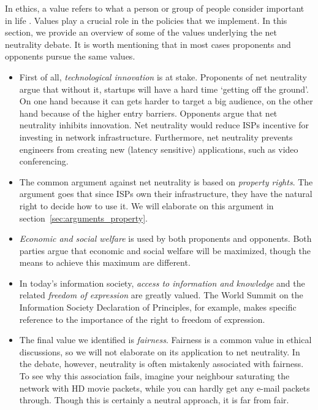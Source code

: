
In ethics, a value refers to what a person or group of people consider important in life \cite{friedman2006value}. Values play a crucial role in the policies that we implement. In this section, we provide an overview of some of the values underlying the net neutrality debate. It is worth mentioning that in most cases proponents and opponents pursue the same values.

\begin{itemize}
\item First of all, \emph{technological innovation} is at stake. Proponents of net neutrality argue that without it, startups will have a hard time `getting off the ground'. On one hand because it can gets harder to target a big audience, on the other hand because of the higher entry barriers. Opponents argue that net neutrality inhibits innovation. Net neutrality would reduce \acp{ISP} incentive for investing in network infrastructure. Furthermore, net neutrality prevents engineers from creating new (latency sensitive) applications, such as video conferencing.

\item The common argument against net neutrality is based on \emph{property rights}. The argument goes that since \acp{ISP} own their infrastructure, they have the natural right to decide how to use it. We will elaborate on this argument in section~\ref{sec:arguments_property}.

\item \emph{Economic and social welfare} is used by both proponents and opponents. Both parties argue that economic and social welfare will be maximized, though the means to achieve this maximum are different.

\item In today's information society, \emph{access to information and knowledge} and the related \emph{freedom of expression} are greatly valued. The World Summit on the Information Society Declaration of Principles, for example, makes specific reference to the importance of the right to freedom of expression.

\item The final value we identified is \emph{fairness}. Fairness is a common value in ethical discussions, so we will not elaborate on its application to net neutrality. In the debate, however, neutrality is often mistakenly associated with fairness. To see why this association fails, imagine your neighbour saturating the network with HD movie packets, while you can hardly get any e-mail packets through. Though this is certainly a neutral approach, it is far from fair.
\end{itemize}